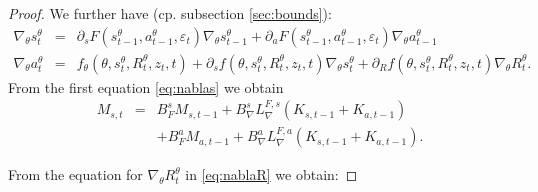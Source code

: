 \documentclass[reqno, 11pt]{amsart}%
\theoremstyle{definition}
\begin{document}
\begin{proof}
We further have (cp. subsection \ref{sec:bounds}):
\begin{eqnarray}\label{eq:nablas}
\nabla_\theta s_t^\theta &=& \partial_sF(s_{t-1}^\theta,a_{t-1}^\theta,\varepsilon_t) \nabla_\theta s_{t-1}^\theta + \partial_aF(s_{t-1}^\theta,a_{t-1}^\theta,\varepsilon_t) \nabla_\theta a_{t-1}^\theta \\\label{eq:nablaa2}
\nabla_\theta a_t^\theta &=& f_\theta(\theta,s_{t}^\theta,R_{t}^\theta,z_t,t)+ \partial_s f(\theta,s_{t}^\theta,R_{t}^\theta,z_t,t) \nabla_\theta s_{t}^\theta + \partial_R f(\theta,s_{t}^\theta,R_{t}^\theta,z_t,t) \nabla_\theta R_{t}^\theta.
\end{eqnarray}
From the first equation \eqref{eq:nablas} we obtain 
\begin{eqnarray*}
    M_{s,t} &=& B_F^s M_{s,t-1} + B_\nabla^s L_\nabla^{F,s}(K_{s,t-1} +K_{a,t-1})\\
    && + B_F^a M_{a,t-1} + B_\nabla^a L_\nabla^{F,a}(K_{s,t-1} +K_{a,t-1}).
\end{eqnarray*}

From the equation for $\nabla_\theta R_t^\theta$ in \eqref{eq:nablaR} we obtain:


\end{proof}
\end{document}
